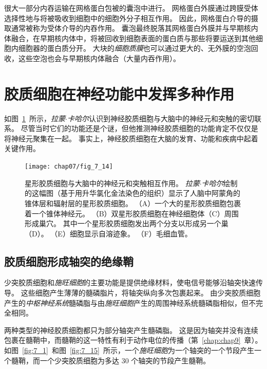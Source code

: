 很大一部分内吞运输在网格蛋白包被的囊泡中进行。
网格蛋白外膜通过跨膜受体选择性地与将被吸收到细胞中的细胞外分子相互作用。
因此，网格蛋白介导的摄取通常被称为受体介导的内吞作用。
囊泡最终脱落其网格蛋白外膜并与早期核内体融合，在早期核内体中，将被回收到细胞表面的蛋白质与那些将要运送到其他细胞内细胞器的蛋白质分开。
大块的\textit{细胞质膜}也可以通过更大的、无外膜的空泡回收，这些空泡也会与早期核内体融合（大量内吞作用）。



\section{胶质细胞在神经功能中发挥多种作用}

如图~\ref{fig:7_14}~所示，\textit{拉蒙$\cdot$卡哈尔}认识到神经胶质细胞与大脑中的神经元和突触的密切联系。
尽管当时它们的功能还是个谜，但他推测神经胶质细胞的功能肯定不仅仅是将神经元聚集在一起。
事实上，神经胶质细胞在大脑的发育、功能和疾病中起着关键作用。


\begin{figure}[htbp]
	\centering
	\texttt{[image: chap07/fig\_7\_14]}
	\caption{星形胶质细胞与大脑中的神经元和突触相互作用。
		\textit{拉蒙$\cdot$卡哈尔}绘制的这幅图（基于用升华氯化金法染色的组织）显示了人脑中阿蒙角的锥体层和辐射层的星形胶质细胞。
		（A）一个大的星形胶质细胞包裹着一个锥体神经元。
		（B）双星形胶质细胞在神经细胞体（C）周围形成巢穴。
		其中一个星形胶质细胞发出两个分支以形成另一个巢（D）。 
		（E）细胞显示自溶迹象。
		（F）毛细血管。 }
	\label{fig:7_14}
\end{figure}



\subsection{胶质细胞形成轴突的绝缘鞘}

少突胶质细胞和\textit{施旺细胞}的主要功能是提供绝缘材料，使电信号能够沿轴突快速传导。
这些细胞产生薄薄的髓磷脂片，将轴突纵向多次包裹起来。
由少突胶质细胞产生的\textit{中枢神经系统}髓磷脂与由\textit{施旺细胞}产生的周围神经系统髓磷脂相似，但不完全相同。


两种类型的神经胶质细胞都只为部分轴突产生髓磷脂。
这是因为轴突并没有连续包裹在髓鞘中，而髓鞘的这一特性有利于动作电位的传播（第~\ref{chap:chap9}~章）。 
如图~\ref{fig:7_1}~和图~\ref{fig:7_15}~所示，一个\textit{施旺细胞}为一个轴突的一个节段产生一个髓鞘，而一个少突胶质细胞为多达 30 个轴突的节段产生髓鞘。


